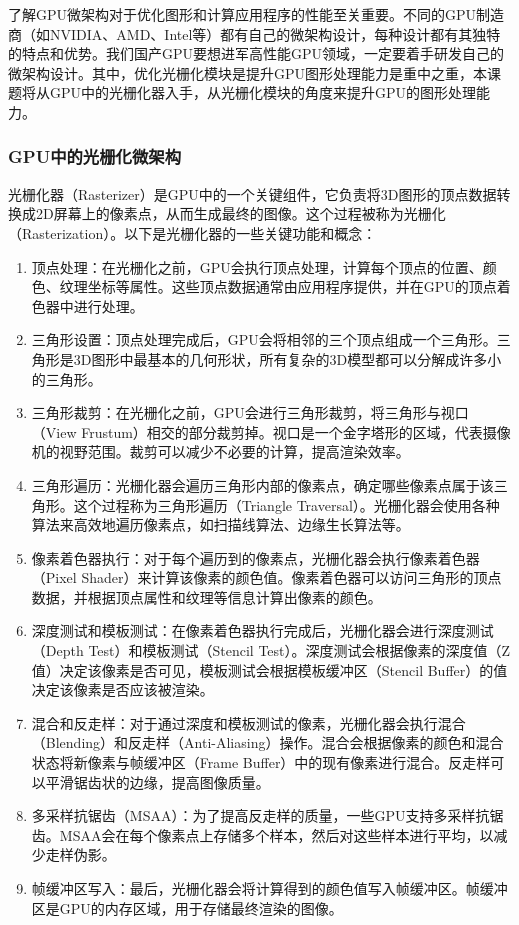 了解GPU微架构对于优化图形和计算应用程序的性能至关重要。不同的GPU制造商（如NVIDIA、AMD、Intel等）都有自己的微架构设计，每种设计都有其独特的特点和优势。我们国产GPU要想进军高性能GPU领域，一定要着手研发自己的微架构设计。其中，优化光栅化模块是提升GPU图形处理能力是重中之重，本课题将从GPU中的光栅化器入手，从光栅化模块的角度来提升GPU的图形处理能力。


\subsubsection{GPU中的光栅化微架构}
光栅化器（Rasterizer）是GPU中的一个关键组件，它负责将3D图形的顶点数据转换成2D屏幕上的像素点，从而生成最终的图像。这个过程被称为光栅化（Rasterization）。以下是光栅化器的一些关键功能和概念：

\begin{enumerate}
    \item 顶点处理：在光栅化之前，GPU会执行顶点处理，计算每个顶点的位置、颜色、纹理坐标等属性。这些顶点数据通常由应用程序提供，并在GPU的顶点着色器中进行处理。
    \item 三角形设置：顶点处理完成后，GPU会将相邻的三个顶点组成一个三角形。三角形是3D图形中最基本的几何形状，所有复杂的3D模型都可以分解成许多小的三角形。
    \item 三角形裁剪：在光栅化之前，GPU会进行三角形裁剪，将三角形与视口（View Frustum）相交的部分裁剪掉。视口是一个金字塔形的区域，代表摄像机的视野范围。裁剪可以减少不必要的计算，提高渲染效率。
    \item 三角形遍历：光栅化器会遍历三角形内部的像素点，确定哪些像素点属于该三角形。这个过程称为三角形遍历（Triangle Traversal）。光栅化器会使用各种算法来高效地遍历像素点，如扫描线算法、边缘生长算法等。
    \item 像素着色器执行：对于每个遍历到的像素点，光栅化器会执行像素着色器（Pixel Shader）来计算该像素的颜色值。像素着色器可以访问三角形的顶点数据，并根据顶点属性和纹理等信息计算出像素的颜色。
    \item 深度测试和模板测试：在像素着色器执行完成后，光栅化器会进行深度测试（Depth Test）和模板测试（Stencil Test）。深度测试会根据像素的深度值（Z值）决定该像素是否可见，模板测试会根据模板缓冲区（Stencil Buffer）的值决定该像素是否应该被渲染。
    \item 混合和反走样：对于通过深度和模板测试的像素，光栅化器会执行混合（Blending）和反走样（Anti-Aliasing）操作。混合会根据像素的颜色和混合状态将新像素与帧缓冲区（Frame Buffer）中的现有像素进行混合。反走样可以平滑锯齿状的边缘，提高图像质量。
    \item 多采样抗锯齿（MSAA）：为了提高反走样的质量，一些GPU支持多采样抗锯齿。MSAA会在每个像素点上存储多个样本，然后对这些样本进行平均，以减少走样伪影。
    \item 帧缓冲区写入：最后，光栅化器会将计算得到的颜色值写入帧缓冲区。帧缓冲区是GPU的内存区域，用于存储最终渲染的图像。
\end{enumerate}

